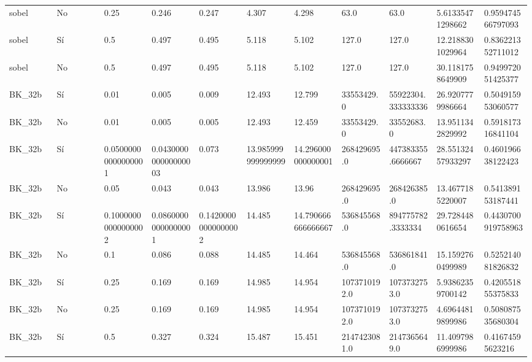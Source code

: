 {{\begin{longtable}{M{0.09\linewidth}M{0.09\linewidth}M{0.09\linewidth}M{0.09\linewidth}M{0.09\linewidth}M{0.09\linewidth}M{0.09\linewidth}M{0.09\linewidth}M{0.09\linewidth}M{0.09\linewidth}M{0.09\linewidth}}
sobel & No & \num{0.25} & \num{0.246} & \num{0.247} & \num{4.307} & \num{4.298} & \num{63.0} & \num{63.0} & \num{5.61335471298662} & \num{0.959474566797093} \\
sobel & Sí & \num{0.5} & \num{0.497} & \num{0.495} & \num{5.118} & \num{5.102} & \num{127.0} & \num{127.0} & \num{12.2188301029964} & \num{0.836221352711012} \\
sobel & No & \num{0.5} & \num{0.497} & \num{0.495} & \num{5.118} & \num{5.102} & \num{127.0} & \num{127.0} & \num{30.1181758649909} & \num{0.949972051425377} \\
BK\_32b & Sí & \num{0.01} & \num{0.005} & \num{0.009} & \num{12.493} & \num{12.799} & \num{33553429.0} & \num{55922304.333333336} & \num{26.9207779986664} & \num{0.504915953060577} \\
BK\_32b & No & \num{0.01} & \num{0.005} & \num{0.005} & \num{12.493} & \num{12.459} & \num{33553429.0} & \num{33552683.0} & \num{13.9511342829992} & \num{0.591817316841104} \\
BK\_32b & Sí & \num{0.05000000000000001} & \num{0.043000000000000003} & \num{0.073} & \num{13.985999999999999} & \num{14.296000000000001} & \num{268429695.0} & \num{447383355.6666667} & \num{28.55132457933297} & \num{0.460196638122423} \\
BK\_32b & No & \num{0.05} & \num{0.043} & \num{0.043} & \num{13.986} & \num{13.96} & \num{268429695.0} & \num{268426385.0} & \num{13.4677185220007} & \num{0.541389153187441} \\
BK\_32b & Sí & \num{0.10000000000000002} & \num{0.08600000000000001} & \num{0.14200000000000002} & \num{14.485} & \num{14.790666666666667} & \num{536845568.0} & \num{894775782.3333334} & \num{29.7284480616654} & \num{0.4430700919758963} \\
BK\_32b & No & \num{0.1} & \num{0.086} & \num{0.088} & \num{14.485} & \num{14.464} & \num{536845568.0} & \num{536861841.0} & \num{15.1592760499989} & \num{0.525214081826832} \\
BK\_32b & Sí & \num{0.25} & \num{0.169} & \num{0.169} & \num{14.985} & \num{14.954} & \num{1073710192.0} & \num{1073732753.0} & \num{5.93862359700142} & \num{0.420551855375833} \\
BK\_32b & No & \num{0.25} & \num{0.169} & \num{0.169} & \num{14.985} & \num{14.954} & \num{1073710192.0} & \num{1073732753.0} & \num{4.69644819899986} & \num{0.508087535680304} \\
BK\_32b & Sí & \num{0.5} & \num{0.327} & \num{0.324} & \num{15.487} & \num{15.451} & \num{2147423081.0} & \num{2147365649.0} & \num{11.4097986999986} & \num{0.41674595623216} \\

\end{longtable}}}
